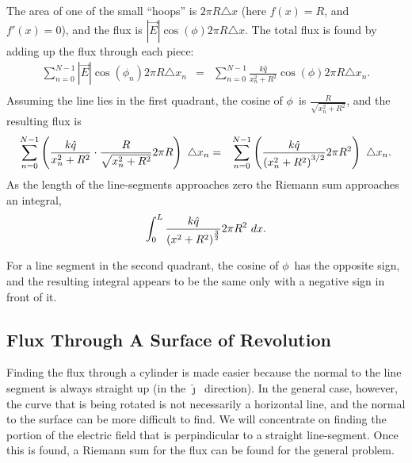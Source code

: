 The area of one of the small ``hoops'' is $2\pi R \triangle x$ (here
$f(x)=R$, and $f'(x)=0$), and the flux is $|\vec{E}|\cos(\phi) 2\pi R
\triangle x$. The total flux is found by adding up the flux through
each piece:
\begin{eqnarray*}
  \sum^{N-1}_{n=0} |\vec{E}|\cos(\phi_n) 2\pi R \triangle x_n & = &
  \sum^{N-1}_{n=0} \frac{k\hat{q}}{x_n^2+R^2} \cos(\phi)
      2\pi R \triangle x_n.\\
\end{eqnarray*}
Assuming the line lies in the first quadrant, the cosine of $\phi$\ is
$\frac{R}{\sqrt{x_n^2+R^2}}$, and the resulting flux is
\begin{eqnarray*}
\sum^{N-1}_{n=0} \left( \frac{k\hat{q}}{x_n^2+R^2} \cdot
                     \frac{R}{\sqrt{x_n^2+R^2}}
      2\pi R \right) ~ \triangle x_n
  & = & \sum^{N-1}_{n=0} \left( \frac{k\hat{q}}{\left( x_n^2+R^2 \right)^{3/2}}
      2\pi R^2 \right) ~ \triangle x_n.
\end{eqnarray*}
As the length of the line-segments approaches zero the Riemann sum
approaches an integral,
\begin{eqnarray*}
  \int^L_{0} \frac{k\hat{q}}{\left({x^2+R^2}\right)^{\frac{3}{2}}}
      2\pi R^2 ~dx.
\end{eqnarray*}

For a line segment in the second quadrant, the cosine of $\phi$\ has
the opposite sign, and the resulting integral appears to be the same
only with a negative sign in front of it.


\subsection{Flux Through A Surface of Revolution}
Finding the flux through a cylinder is made easier because the normal
to the line segment is always straight up (in the $\hat{\jmath}$\
direction). In the general case, however, the curve that is being
rotated is not necessarily a horizontal line, and the normal to the
surface can be more difficult to find. We will concentrate on finding
the portion of the electric field that is perpindicular to a straight
line-segment. Once this is found, a Riemann sum for the flux can be
found for the general problem.

